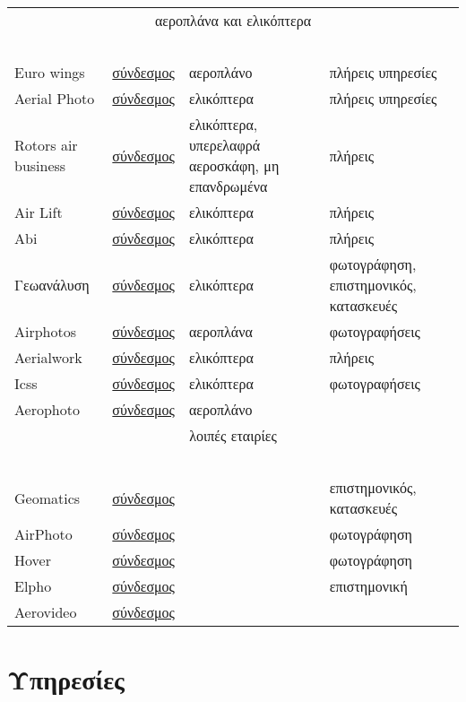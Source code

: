\documentclass[a4paper, 12pt, twoside]{report}
\begin{document}
\begin{longtable} { m{2.2cm} m{2cm} m{3.5cm} m{3.5cm} }
					\multicolumn{4}{c}{αεροπλάνα και ελικόπτερα}\\
					\hdashline
					~\\
					Euro wings & \href{http://www.eurowings.gr}{σύνδεσμος} & αεροπλάνο & πλήρεις υπηρεσίες\\
					Aerial Photo & \href{http://www.aerialphoto.gr/}{σύνδεσμος} & ελικόπτερα & πλήρεις υπηρεσίες\\
					Rotors air business & \href{http://www.rotors.gr/}{σύνδεσμος} & ελικόπτερα, υπερελαφρά αεροσκάφη, μη επανδρωμένα & πλήρεις\\
					Air Lift & \href{http://www.airlift.gr}{σύνδεσμος} & ελικόπτερα & πλήρεις\\
					Abi & \href{http://www.abi.gr}{σύνδεσμος} & ελικόπτερα & πλήρεις\\
					Γεωανάλυση & \href{http://www.geoanalysis.gr}{σύνδεσμος} & ελικόπτερα & φωτογράφηση, επιστημονικός, κατασκευές\\
					Airphotos & \href{http://www.airphotos.gr}{σύνδεσμος} & αεροπλάνα & φωτογραφήσεις\\
					Aerialwork & \href{http://www.aerialwork.com/}{σύνδεσμος} & ελικόπτερα & πλήρεις\\
					Icss & \href{http://www.icss.gr/}{σύνδεσμος} & ελικόπτερα & φωτογραφήσεις\\
					Aerophoto & \href{http://www.aerophoto.gr/}{σύνδεσμος} & αεροπλάνο & \\
					\multicolumn{4}{c}{λοιπές εταιρίες}\\
					\hdashline
					~\\					
					Geomatics & \href{http://www.geomatics.gr}{σύνδεσμος} & & επιστημονικός, κατασκευές\\
					AirPhoto & \href{http://www.airphoto.gr/}{σύνδεσμος} & & φωτογράφηση\\
					Hover & \href{http://www.hover.gr/}{σύνδεσμος} & & φωτογράφηση\\
					Elpho & \href{http://www.elpho.gr}{σύνδεσμος} & & επιστημονική\\
					Aerovideo & \href{http://www.aerovideo.gr/}{σύνδεσμος} & & \\    
					\hline
				\end{longtable}
	
		\section{Υπηρεσίες}
\end{document}
